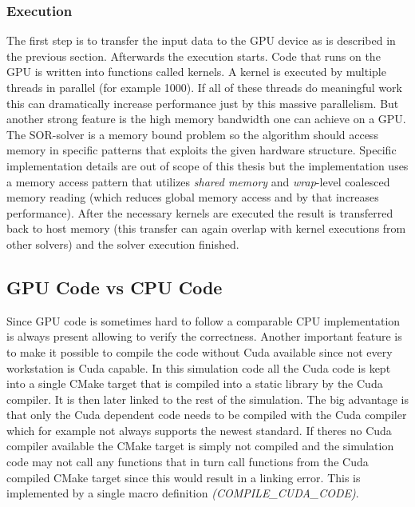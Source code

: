 \documentclass[master.tex]{subfiles}
\begin{document}
\subsubsection{Execution}
The first step is to transfer the input data to the GPU device as is described in the previous section. Afterwards the execution starts.\newline
Code that runs on the GPU is written into functions called kernels. A kernel is executed by multiple threads in parallel (for example 1000). If all of these threads do meaningful work this can dramatically increase performance just by this massive parallelism. But another strong feature is the high memory bandwidth one can achieve on a GPU. The \ac{SOR}-solver is a memory bound problem so the algorithm should access memory in specific patterns that exploits the given hardware structure. Specific implementation details are out of scope of this thesis but the implementation uses a memory access pattern that utilizes \textit{shared memory} and \textit{wrap}-level coalesced memory reading (which reduces global memory access and by that increases performance).\newline
After the necessary kernels are executed the result is transferred back to host memory (this transfer can again overlap with kernel executions from other solvers) and the solver execution finished.


\subsection{GPU Code vs CPU Code}
Since GPU code is sometimes hard to follow a comparable CPU implementation is always present allowing to verify the correctness.\newline
Another important feature is to make it possible to compile the code without Cuda available since not every workstation is Cuda capable. In this simulation code all the Cuda code is kept into a single CMake target that is compiled into a static library by the Cuda compiler. It is then later linked to the rest of the simulation. The big advantage is that only the Cuda dependent code needs to be compiled with the Cuda compiler which for example not always supports the newest standard. If theres no Cuda compiler available the CMake target is simply not compiled and the simulation code may not call any functions that in turn call functions from the Cuda compiled CMake target since this would result in a linking error. This is implemented by a single macro definition \textit{(COMPILE\_CUDA\_CODE)}.
\end{document}
